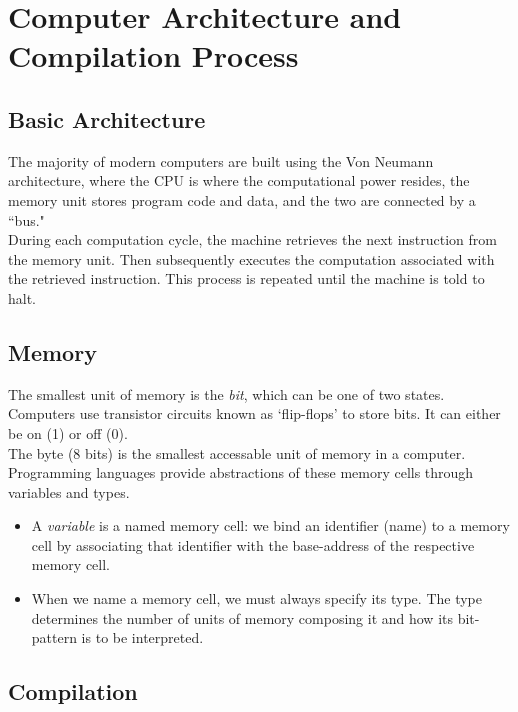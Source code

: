 \documentclass{article}
\begin{document}
\tableofcontents

	\section{Computer Architecture and Compilation Process}
	
	\subsection{Basic Architecture}
	
	The majority of modern computers are built using the Von Neumann architecture, where the CPU is where the computational power resides, the memory unit stores program code and data, and the two are connected by a ``bus."\\
	
	During each computation cycle, the machine retrieves the next instruction from the memory unit. Then subsequently executes the computation associated with the retrieved instruction. This process is repeated until the machine is told to halt.
	
	\subsection{Memory}
	
	The smallest unit of memory is the \textit{bit}, which can be one of two states.\\
	
	Computers use transistor circuits known as `flip-flops' to store bits. It can either be on (1) or off (0). \\
	
	The byte (8 bits) is the smallest accessable unit of memory in a computer.\\
	
	Programming languages provide abstractions of these memory cells through variables and types.
	\begin{itemize}
		\item A \textit{variable} is a named memory cell: we bind an identifier (name) to a memory cell by associating that identifier with the base-address of  the respective memory cell.
		\item When we name a memory cell, we must always specify its type. The type determines the number of units of memory composing it and how its bit-pattern is to be interpreted.
	\end{itemize}

	\subsection{Compilation}
	
\end{document}
